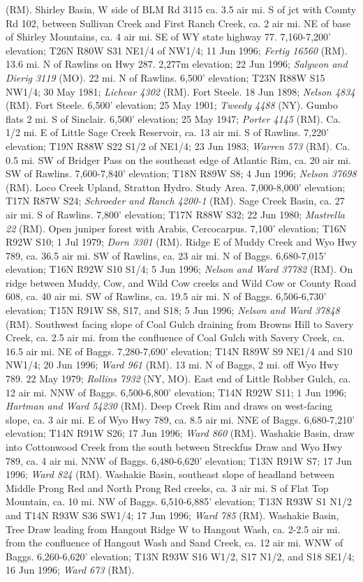 (RM).  Shirley Basin, W side of BLM Rd 3115 ca. 3.5 air mi. S of jct with County Rd 102, between Sullivan Creek and First Ranch Creek, ca. 2 air mi. NE of base of Shirley Mountains, ca. 4 air mi. SE of WY state highway 77. 7,160-7,200’ elevation; T26N R80W S31 NE1/4 of NW1/4; 11 Jun 1996; \textit{Fertig 16560} (RM).  13.6 mi. N of Rawlins on Hwy 287. 2,277m elevation; 22 Jun 1996; \textit{Salywon and Dierig 3119} (MO).  22 mi. N of Rawlins. 6,500’ elevation; T23N R88W S15 NW1/4; 30 May 1981; \textit{Lichvar 4302} (RM).  Fort Steele. 18 Jun 1898; \textit{Nelson 4834} (RM).  Fort Steele. 6,500’ elevation; 25 May 1901; \textit{Tweedy 4488} (NY).  Gumbo flats 2 mi. S of Sinclair. 6,500’ elevation; 25 May 1947; \textit{Porter 4145} (RM).  Ca. 1/2 mi. E of Little Sage Creek Reservoir, ca. 13 air mi. S of Rawlins. 7,220’ elevation; T19N R88W S22 S1/2 of NE1/4; 23 Jun 1983; \textit{Warren 573} (RM).  Ca. 0.5 mi. SW of Bridger Pass on the southeast edge of Atlantic Rim, ca. 20 air mi. SW of Rawlins. 7,600-7,840’ elevation; T18N R89W S8; 4 Jun 1996; \textit{Nelson 37698} (RM).  Loco Creek Upland, Stratton Hydro. Study Area. 7,000-8,000’ elevation; T17N R87W S24; \textit{Schroeder and Ranch 4200-1} (RM).  Sage Creek Basin, ca. 27 air mi. S of Rawlins. 7,800’ elevation; T17N R88W S32; 22 Jun 1980; \textit{Mastrella 22} (RM).  Open juniper forest with Arabis, Cercocarpus. 7,100’ elevation; T16N R92W S10; 1 Jul 1979; \textit{Dorn 3301} (RM).  Ridge E of Muddy Creek and Wyo Hwy 789, ca. 36.5 air mi. SW of Rawlins, ca. 23 air mi. N of Baggs. 6,680-7,015’ elevation; T16N R92W S10 S1/4; 5 Jun 1996; \textit{Nelson and Ward 37782} (RM).  On ridge between Muddy, Cow, and Wild Cow creeks and Wild Cow or County Road 608, ca. 40 air mi. SW of Rawlins, ca. 19.5 air mi. N of Baggs. 6,506-6,730’ elevation; T15N R91W S8, S17, and S18; 5 Jun 1996; \textit{Nelson and Ward 37848} (RM).  Southwest facing slope of Coal Gulch draining from Browns Hill to Savery Creek, ca. 2.5 air mi. from the confluence of Coal Gulch with Savery Creek, ca. 16.5 air mi. NE of Baggs.	7,280-7,690' elevation; T14N R89W S9 NE1/4 and S10 NW1/4; 20 Jun 1996; \textit{Ward 961} (RM).  13 mi. N of Baggs, 2 mi. off Wyo Hwy 789. 22 May 1979; \textit{Rollins 7932} (NY, MO).  East end of Little Robber Gulch, ca. 12 air mi. NNW of Baggs. 6,500-6,800’ elevation; T14N R92W S11; 1 Jun 1996; \textit{Hartman and Ward 54230} (RM).  Deep Creek Rim and draws on west-facing slope, ca. 3 air mi. E of Wyo Hwy 789, ca. 8.5 air mi. NNE of Baggs. 6,680-7,210’ elevation; T14N R91W S26; 17 Jun 1996; \textit{Ward 860} (RM).  Washakie Basin, draw into Cottonwood Creek from the south between Streckfus Draw and Wyo Hwy 789, ca. 4 air mi. NNW of Baggs. 6,480-6,620’ elevation; T13N R91W S7; 17 Jun 1996; \textit{Ward 824} (RM).  Washakie Basin, southeast slope of headland between Middle Prong Red and North Prong Red creeks, ca. 3 air mi. S of Flat Top Mountain, ca. 10 mi. NW of Baggs. 6,510-6,885’ elevation; T13N R93W S1 N1/2 and T14N R93W S36 SW1/4; 17 Jun 1996; \textit{Ward 785} (RM).  Washakie Basin, Tree Draw leading from Hangout Ridge W to Hangout Wash, ca. 2-2.5 air mi. from the confluence of Hangout Wash and Sand Creek, ca. 12 air mi. WNW of Baggs. 6,260-6,620’ elevation; T13N R93W S16 W1/2, S17 N1/2, and S18 SE1/4; 16 Jun 1996; \textit{Ward 673} (RM).  